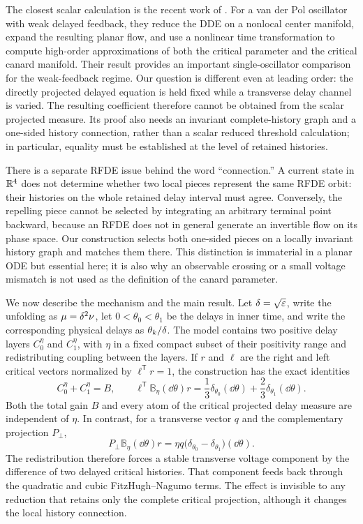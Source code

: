 The closest scalar calculation is the recent work of
\citet{zhang2026high}.  For a van der Pol oscillator with weak delayed
feedback, they reduce the DDE on a nonlocal center manifold, expand the
resulting planar flow, and use a nonlinear time transformation to compute
high-order approximations of both the critical parameter and the critical
canard manifold.  Their result provides an important single-oscillator
comparison for the weak-feedback regime.  Our question is different even at
leading order: the directly projected delayed equation is held fixed while a
transverse delay channel is varied.  The resulting coefficient therefore
cannot be obtained from the scalar projected measure.  Its proof also needs
an invariant complete-history graph and a one-sided history connection,
rather than a scalar reduced threshold calculation; in particular, equality
must be established at the level of retained histories.

There is a separate RFDE issue behind the word ``connection.''  A current
state in \(\mathbb R^4\) does not determine whether two local pieces represent the
same RFDE orbit: their histories on the whole retained delay interval must
agree.  Conversely, the repelling piece cannot be selected by integrating an
arbitrary terminal point backward, because an RFDE does not in general
generate an invertible flow on its phase space.  Our construction selects
both one-sided pieces on a locally invariant history graph and matches them
there.  This distinction is immaterial in a planar ODE but essential here;
it is also why an observable crossing or a small voltage mismatch is not
used as the definition of the canard parameter.

We now describe the mechanism and the main result.  Let
\(\delta=\sqrt{\varepsilon}\), write the unfolding as \(\mu=\delta^2\nu\), let
\(0<\theta_0<\theta_1\) be the delays in inner time, and write the
corresponding physical delays as \(\theta_k/\delta\).  The model contains two
positive delay layers \(C_0^\eta\) and \(C_1^\eta\), with \(\eta\) in a fixed
compact subset of their positivity range and redistributing coupling between
the layers.  If \(r\) and \(\ell\) are the right and left critical vectors
normalized by \(\ell^{\mathsf T}r=1\), the construction has the exact
identities
\[
 C_0^\eta+C_1^\eta=B,
 \qquad
 \ell^{\mathsf T}\mathbb B_\eta(\dd\theta)r
 =\frac13\delta_{\theta_0}(\dd\theta)
  +\frac23\delta_{\theta_1}(\dd\theta).
\]
Both the total gain \(B\) and every atom of the critical projected delay
measure are independent of \(\eta\).  In contrast, for a transverse vector
\(q\) and the complementary projection \(P_\perp\),
\[
 P_\perp\mathbb B_\eta(\dd\theta)r
 =\eta q\bigl(\delta_{\theta_0}-\delta_{\theta_1}\bigr)(\dd\theta).
\]
The redistribution therefore forces a stable transverse voltage component
by the difference of two delayed critical histories.  That component feeds
back through the quadratic and cubic FitzHugh--Nagumo terms.  The effect is
invisible to any reduction that retains only the complete critical
projection, although it changes the local history connection.

